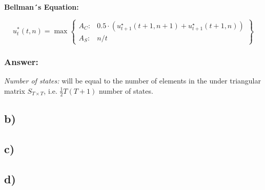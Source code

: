 \documentclass{article}
\begin{document}
\textbf{Bellman´s Equation:}

\begin{equation}
    u_{t}^{*}(t,n) = \max
    \left\{\begin{matrix}
    A_C: &  0.5 \cdot\left( u_{t+1}^{\star}\left(t+1 ,n+1\right) + u_{t+1}^{\star}\left(t+1 ,n\right)\right)\\
    A_S: &  n/t
    \end{matrix}\right\}
\end{equation}

\subsubsection*{Answer:}
\textit{Number of states:} will be equal to the number of elements in the under triangular matrix $S_{T\times T}$, i.e. $\frac{1}{2}T(T+1)$ number of states.

\subsection*{b)}
\subsection*{c)}
\subsection*{d)}
\end{document}
